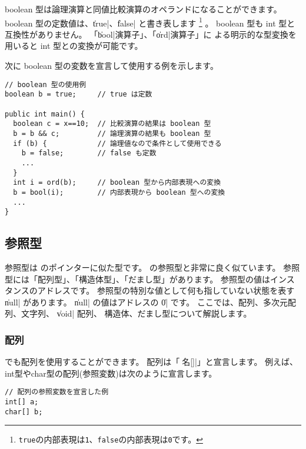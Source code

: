 boolean 型は論理演算と同値比較演算のオペランドになることができます。
boolean 型の定数値は、\|true|、\|false| と書き表します
\footnote{{\tt true}の内部表現は{\tt 1}、{\tt false}の内部表現は{\tt 0}です。}
。
boolean 型も int 型と互換性がありません。
「\|bool|演算子」、「\|ord|演算子」に
よる明示的な型変換を用いると int 型との変換が可能です。

次に boolean 型の変数を宣言して使用する例を示します。

\begin{mylist}
\begin{verbatim}
// boolean 型の使用例
boolean b = true;     // true は定数

public int main() {
  boolean c = x==10;  // 比較演算の結果は boolean 型
  b = b && c;         // 論理演算の結果も boolean 型
  if (b) {            // 論理値なので条件として使用できる
    b = false;        // false も定数
    ...
  }
  int i = ord(b);     // boolean 型から内部表現への変換
  b = bool(i);        // 内部表現から boolean 型への変換
  ...
}
\end{verbatim}
\end{mylist}

\subsection{参照型}
\label{chap3:ref}

参照型は \cl のポインターに似た型です。
\javal の参照型と非常に良く似ています。
参照型には「配列型」、「構造体型」、「だまし型」があります。
参照型の値はインスタンスのアドレスです。
参照型の特別な値として何も指していない状態を表す \|null| があります。
\|null| の値はアドレスの \|0| です。
ここでは、配列、多次元配列、文字列、 \|void| 配列、
構造体、だまし型について解説します。

\subsubsection{配列}
\label{chap3:array}
\cmml でも配列を使用することができます。
配列は「\|型名[]|」と宣言します。
例えば、int型やchar型の配列(参照変数)は次のように宣言します。

\begin{mylist}
\begin{verbatim}
// 配列の参照変数を宣言した例
int[] a;
char[] b;
\end{verbatim}
\end{mylist}


